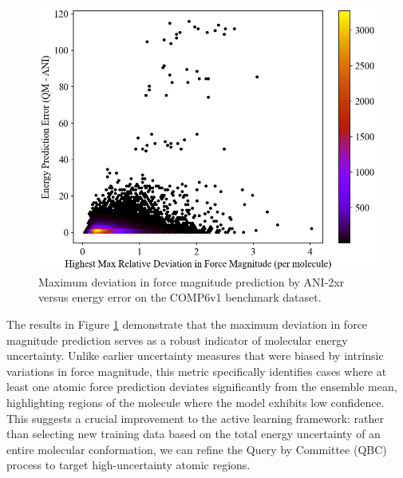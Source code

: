 \begin{figure}[!ht]
    \centering
    \includegraphics[width=1\linewidth]{Images/2xr_forces/2xr_comp6v1_force-highest-force_deviation-vs-energy.png}
    \caption[Maximum deviation in force magnitude prediction versus energy error (COMP6v1)]{Maximum deviation in force magnitude prediction by ANI-2xr versus energy error on the COMP6v1 benchmark dataset.}
    \label{fig:2xr_comp6v1-forces-highest_deviation}
\end{figure}

The results in Figure \ref{fig:2xr_comp6v1-forces-highest_deviation} demonstrate that the maximum deviation in force magnitude prediction serves as a robust indicator of molecular energy uncertainty. Unlike earlier uncertainty measures that were biased by intrinsic variations in force magnitude, this metric specifically identifies cases where at least one atomic force prediction deviates significantly from the ensemble mean, highlighting regions of the molecule where the model exhibits low confidence. This suggests a crucial improvement to the active learning framework: rather than selecting new training data based on the total energy uncertainty of an entire molecular conformation, we can refine the Query by Committee (QBC) process to target high-uncertainty atomic regions.

